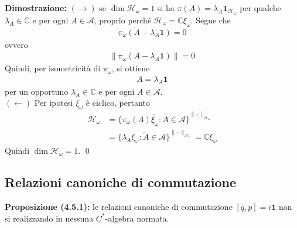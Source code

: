 \documentclass{article}
\numberwithin{equation}{subsection}
\begin{document}
\textbf{Dimostrazione:} $(\rightarrow)$ se $\dim \mathcal{H}_\omega = 1$ si ha $\pi(A) = \lambda_A\mathbf{1}_{\mathcal{H}_\omega}$ per qualche $\lambda_A \in \mathbb{C}$ e per ogni $A \in \mathscr{A}$, proprio perché $\mathcal{H}_\omega = \mathbb{C}\xi_\omega$. Segue che
\begin{align*}
    \pi_\omega(A - \lambda_A\mathbf{1}) = 0
\end{align*}
ovvero
\begin{align*}
    \|\pi_\omega(A - \lambda_A\mathbf{1})\| = 0
\end{align*}
Quindi, per isometricità di $\pi_\omega$, si ottiene
\begin{align*}
    A = \lambda_A\mathbf{1}
\end{align*}
per un opportuno $\lambda_A \in \mathbb{C}$ e per ogni $A \in \mathscr{A}$. \\
$(\leftarrow)$ Per ipotesi $\xi_\omega$ è ciclico, pertanto
\begin{align*}
    \mathcal{H}_\omega &= \overline{\{\pi_\omega(A)\xi_\omega : A \in \mathscr{A}\}}^{\|\cdot\|_{\mathcal{H}_\omega}} \\
    &= \overline{\{\lambda_A\xi_\omega : A \in \mathscr{A}\}}^{\|\cdot\|_{\mathcal{H}_\omega}} = \mathbb{C}\xi_\omega
\end{align*}
Quindi $\dim \mathcal{H}_\omega = 1$. \qed

\newpage
\subsection{Relazioni canoniche di commutazione}
\textbf{Proposizione (4.5.1):} le relazioni canoniche di commutazione $[q, p] = i\mathbf{1}$ non si realizzando in nessuna $C^*$-algebra normata. \\
\end{document}
